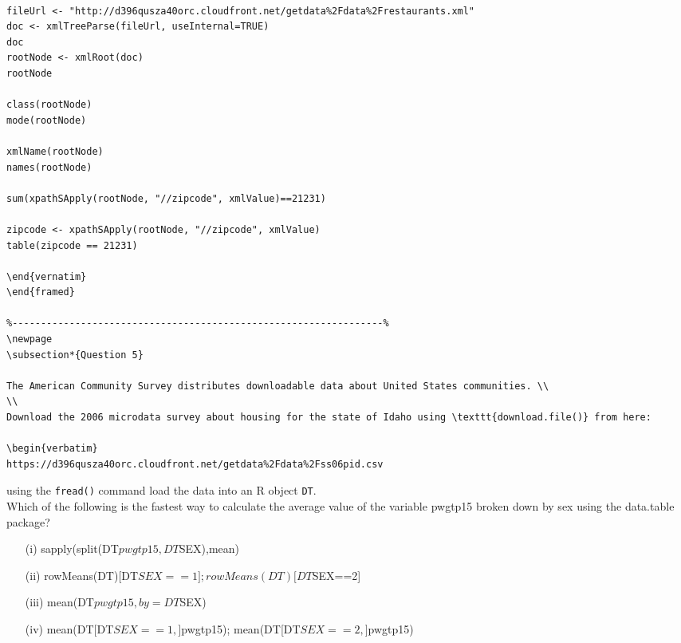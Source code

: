 \documentclass[]{article}
\begin{document}
\begin{framed}
\begin{verbatim}

fileUrl <- "http://d396qusza40orc.cloudfront.net/getdata%2Fdata%2Frestaurants.xml"
doc <- xmlTreeParse(fileUrl, useInternal=TRUE)
doc
rootNode <- xmlRoot(doc)
rootNode

class(rootNode)
mode(rootNode)

xmlName(rootNode)
names(rootNode)

sum(xpathSApply(rootNode, "//zipcode", xmlValue)==21231) 

zipcode <- xpathSApply(rootNode, "//zipcode", xmlValue)
table(zipcode == 21231)

\end{vernatim}
\end{framed}

%-----------------------------------------------------------------%
\newpage
\subsection*{Question 5}
 
The American Community Survey distributes downloadable data about United States communities. \\
\\
Download the 2006 microdata survey about housing for the state of Idaho using \texttt{download.file()} from here:
 
\begin{verbatim}
https://d396qusza40orc.cloudfront.net/getdata%2Fdata%2Fss06pid.csv
\end{verbatim}
 using the \texttt{fread()} command load the data into an R object \texttt{DT}.\\ Which of the following is the fastest way to calculate the average value of the variable pwgtp15  broken down by sex using the data.table package? 

\begin{itemize}
\item[(i)] sapply(split(DT$pwgtp15,DT$SEX),mean) 

\item[(ii)] rowMeans(DT)[DT$SEX==1]; rowMeans(DT)[DT$SEX==2] 

\item[(iii)] mean(DT$pwgtp15,by=DT$SEX) 

\item[(iv)] mean(DT[DT$SEX==1,]$pwgtp15); mean(DT[DT$SEX==2,]$pwgtp15) 


\end{itemize}
\end{framed}
\end{document}
